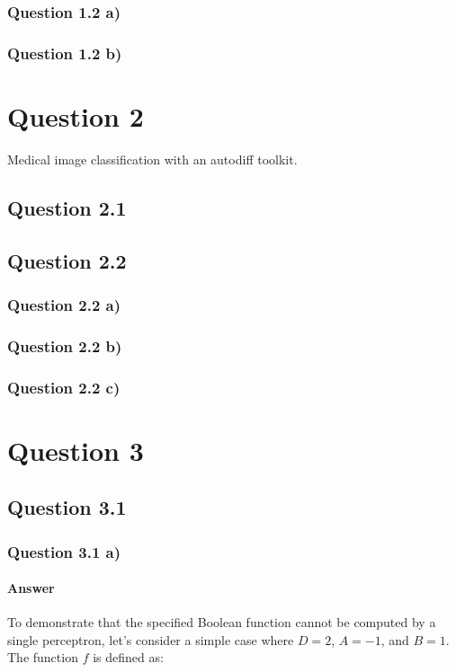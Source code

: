 \documentclass{article}
\begin{document}
\subsubsection{Question 1.2 a)}
\subsubsection{Question 1.2 b)}

\section{Question 2}
Medical image classification with an autodiff toolkit.

\subsection{Question 2.1}

\subsection{Question 2.2}

\subsubsection{Question 2.2 a)}
\subsubsection{Question 2.2 b)}
\subsubsection{Question 2.2 c)}

\section{Question 3}

\subsection{Question 3.1}
\subsubsection{Question 3.1 a)}
\paragraph{Answer}

To demonstrate that the specified Boolean function cannot be computed by a single perceptron, let's consider a simple case where \( D = 2 \), \( A = -1 \), and \( B = 1 \). The function \( f \) is defined as:
\end{document}
